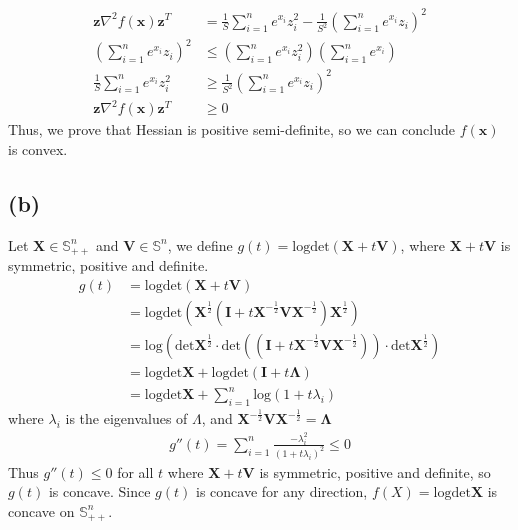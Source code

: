 \documentclass{article}
\begin{document}
\begin{align*}
    \bm{z}\nabla^2 f(\bm{x})\bm{z}^T &= \frac{1}{S}\sum_{i=1}^{n}e^{x_i}z_i^2 - \frac{1}{S^2}(\sum_{i=1}^{n}e^{x_i}z_i)^2 \\
    (\sum_{i=1}^{n}e^{x_i}z_i)^2 &\leq (\sum_{i=1}^{n}e^{x_i}z_i^2)(\sum_{i=1}^{n}e^{x_i}) \\
    \frac{1}{S}\sum_{i=1}^{n}e^{x_i}z_i^2 &\geq \frac{1}{S^2}(\sum_{i=1}^{n}e^{x_i}z_i)^2 \\
    \bm{z}\nabla^2 f(\bm{x})\bm{z}^T &\geq 0
\end{align*}
Thus, we prove that Hessian is positive semi-definite, so we can conclude \(f(\bm{x})\) is convex.

\subsection*{(b)}
Let \(\bm{X} \in \mathbb{S}_{++}^{n}\) and \(\bm{V} \in \mathbb{S}^n\), we define \(g(t) = \text{log} \text{det} (\bm{X} + t\bm{V})\), where \(\bm{X} + t\bm{V}\) is symmetric, positive and definite.
\begin{align*}
    g(t) &= \text{log} \text{det} (\bm{X} + t\bm{V}) \\
    &= \text{log} \text{det} (\bm{X}^{\frac{1}{2}}(\bm{I} + t\bm{X}^{-\frac{1}{2}} \bm{V} \bm{X}^{-\frac{1}{2}})\bm{X}^{\frac{1}{2}}) \\
    &= \text{log}(\text{det}  \bm{X}^{\frac{1}{2}} \cdot \text{det} ((\bm{I} + t\bm{X}^{-\frac{1}{2}} \bm{V} \bm{X}^{-\frac{1}{2}})) \cdot \text{det}\bm{X}^{\frac{1}{2}}) \\
    &= \text{log} \text{det} \bm{X} + \text{log} \text{det} (\bm{I} + t\bm{\Lambda}) \\
    &= \text{log} \text{det} \bm{X} + \sum_{i=1}^{n} \text{log}(1 + t\lambda_i)
\end{align*}
where \(\lambda_i\) is the eigenvalues of \(\Lambda\), and \(\bm{X}^{-\frac{1}{2}} \bm{V} \bm{X}^{-\frac{1}{2}} = \bm{\Lambda}\) 
\begin{align*}
    g''(t) = \sum_{i=1}^{n} \frac{-\lambda_i^2}{(1 + t \lambda_i)^2} \leq 0
\end{align*}
Thus \(g''(t) \leq 0\) for all \(t\) where \(\bm{X} + t\bm{V}\) is symmetric, positive and definite, so \(g(t)\) is concave.
Since \(g(t)\) is concave for any direction, \(f(X) = \text{log} \text{det} \bm{X}\) is concave on \(\mathbb{S}_{++}^{n}\).
\end{document}
